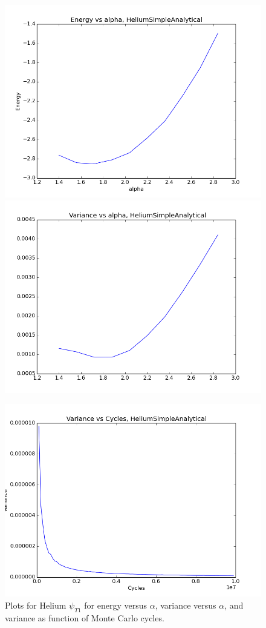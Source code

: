 \documentclass[11pt]{article}
\begin{document}
		\begin{figure}
		\centering \includegraphics[width=0.45\linewidth]{../figures/EnergyVsAlphaHeliumSimpleAnalytical}
		\includegraphics[width=0.45\linewidth]{../figures/VarianceVsAlphaHeliumSimpleAnalytical}

		\includegraphics[width=0.45\linewidth]{../figures/VarianceNCyclesHeliumSimpleAnalytical}\protect\protect\caption{Plots for Helium $\psi_{T1}$ for energy versus $\alpha$, variance versus $\alpha$, and variance as function of Monte Carlo cycles.}
		\label{fig01:alpha_Simple}
		\end{figure}
\end{document}
